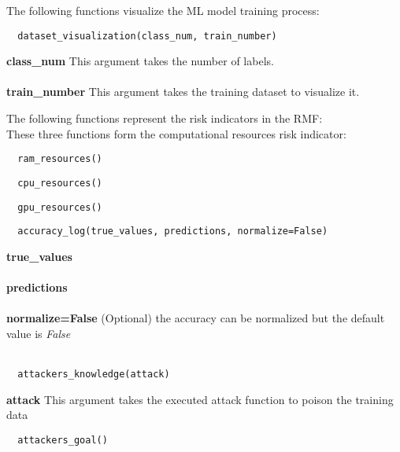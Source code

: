 The following functions visualize the ML model training process: \\

\begin{lstlisting}
  dataset_visualization(class_num, train_number)
\end{lstlisting}

\noindent\textbf{class\_num}
This argument takes the number of labels. \\ \\

\textbf{train\_number}
This argument takes the training dataset to visualize it.

The following functions represent the risk indicators in the RMF: \\
These three functions form the computational resources risk indicator: \\
\begin{lstlisting}
  ram_resources()
\end{lstlisting}

\begin{lstlisting}
  cpu_resources()
\end{lstlisting}

\begin{lstlisting}
  gpu_resources()
\end{lstlisting}

\begin{lstlisting}
  accuracy_log(true_values, predictions, normalize=False)
\end{lstlisting}

\noindent\textbf{true\_values}
\\ \\
\textbf{predictions}
\\ \\
\textbf{normalize=False}
(Optional) the accuracy can be normalized but the default value is \textit{False} \\ \\

\begin{lstlisting}
  attackers_knowledge(attack)
\end{lstlisting}

\noindent\textbf{attack}
This argument takes the executed attack function to poison the training data \\

\begin{lstlisting}
  attackers_goal()
\end{lstlisting}

